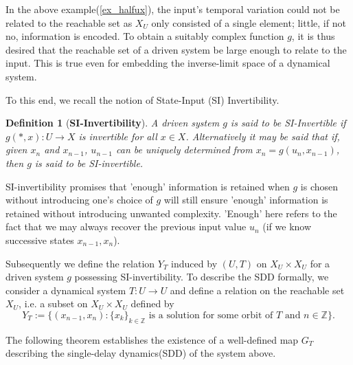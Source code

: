 \documentclass[a4paper,12pt,twoside]{report}
\newtheorem{Definition}{Definition}[]
\begin{document}

In the above example(\ref{ex_halfux}), the input's temporal variation could not be related to the reachable set as $X_U$ only consisted of a single element; little, if not no, information is encoded.
To obtain a suitably complex function $g$, it is thus desired that the reachable set of a driven system  be large enough to relate to the input. 
This is true even for embedding  the inverse-limit space of a dynamical system. 


 To this end, we recall the notion of State-Input (SI) Invertibility.  

\begin{Definition}
  [\bf SI-Invertibility]\label{Dfn_SIinv}\rm
  A driven system $g$ is said to be SI-Invertible if $g(*,x): U \to X$ is invertible for all $x\in X$. Alternatively it may be said that if, given $x_n$ and $x_{n-1}$, $u_{n-1}$ can be uniquely determined from $x_n=g(u_n,x_{n-1})$, then $g$ is said to be SI-invertible.
\end{Definition}
 
SI-invertibility promises that 'enough' information is retained when $g$ is chosen without introducing one's choice of $g$ will still ensure 'enough' information is retained without introducing unwanted complexity. 
'Enough' here refers to the fact that we may always recover the previous input value $u_n$ (if we know successive states $x_{n-1}, x_n$).

Subsequently we define the relation $Y_T$ induced by $(U,T)$ on $X_U\times{X_U}$ for a driven system $g$ possessing SI-invertibility.  
To describe the  SDD formally, we consider a dynamical system $T: U \to U$ and define a relation on the reachable set $X_U$, i.e. a subset on $X_U \times X_U$  defined by 
$$Y_T:=\{(x_{n-1},x_n): \{x_k\}_{k\in \mathbb{Z}} \mbox{ is a solution for some orbit of } T \mbox{ and } n \in \mathbb{Z}\}.$$ 

The following theorem establishes the existence of a well-defined map $G_T$ describing the single-delay dynamics(SDD) of the system above. 
\end{document}
